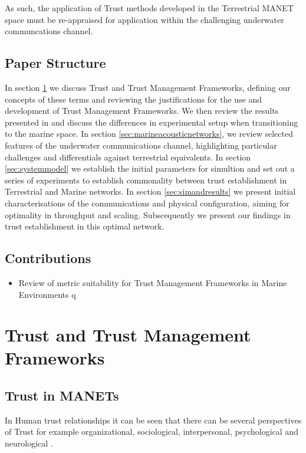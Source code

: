 \documentclass[runningheads,a4paper]{llncs}
\begin{document}
As such, the application of Trust methods developed in the Terrestrial MANET space must be re-appraised for application within the challenging underwater communcations channel.

\subsection{Paper Structure}

In section \ref{sec:trustandtmfs} we discuss Trust and Trust Management Frameworks, defining our concepts of these terms and reviewing the justifications for the use and development of Trust Management Frameworks. We then review the results presented in \cite{Guo11} and discuss the differences in experimental setup when transitioning to the marine space.
In section \ref{sec:marineacousticnetworks}, we review selected features of the underwater communications channel, highlighting particular challenges and differentials against terrestrial equivalents. 
In section \ref{sec:systemmodel} we establish the initial parameters for simultion and set out a series of experiments to establish commonality between trust establishment in Terrestrial and Marine networks.
In section \ref{sec:simandresults} we present initial characterisations of the communications and physical configuration, aiming for optimality in throughput and scaling. Subscequently we present our findings in trust establishment in this optimal network.

\subsection{Contributions}
\begin{itemize}
  \item Review of metric suitability for Trust Management Frameworks in Marine Environments
q\end{itemize}

\section{Trust and Trust Management Frameworks}\label{sec:trustandtmfs}

\subsection{Trust in MANETs}\label{sec:trustinmanets}

In Human trust relationships it can be seen that there can be several perspectives of Trust for example organizational, sociological, interpersonal, psychological and neurological \cite{Lee2004}. 
\end{document}
